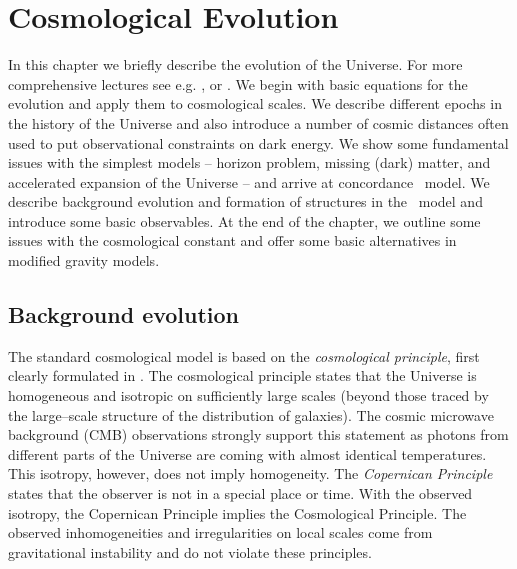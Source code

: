 \chapter{Cosmological Evolution}
\label{chpt:cosmo_evol}
In this chapter we briefly describe the evolution of the Universe. For more comprehensive lectures see e.g. \textcite{Ref:Weinberg}, \textcite{2002col.luc..cosmology} or \textcite{2010deto.book.....A}. We begin with basic equations for the evolution and apply them to cosmological scales. We describe different epochs in the history of the Universe and also introduce a number of cosmic distances often used to put observational constraints on dark energy. We show some fundamental issues with the simplest models -- horizon problem, missing (dark) matter, and accelerated expansion of the Universe -- and arrive at concordance \LCDM\ model. We describe background evolution and formation of structures in the \LCDM\ model and introduce some basic observables. At the end of the chapter, we outline some issues with the cosmological constant and offer some basic alternatives in modified gravity models.

\section{Background evolution}
The standard cosmological model is based on the \textit{cosmological principle}, first clearly formulated in \textcite{1687pnpm.book.....N}. The cosmological principle states that the Universe is homogeneous and isotropic on sufficiently large scales (beyond those traced by the large--scale structure of the distribution of galaxies). The cosmic microwave background (CMB) observations strongly support this statement as photons from different parts of the Universe are coming with almost identical temperatures. This isotropy, however, does not imply homogeneity. The \textit{Copernican Principle} states that the observer is not in a special place or time. With the observed isotropy, the Copernican Principle implies the Cosmological Principle. The observed inhomogeneities and irregularities on local scales come from gravitational instability and do not violate these principles.







